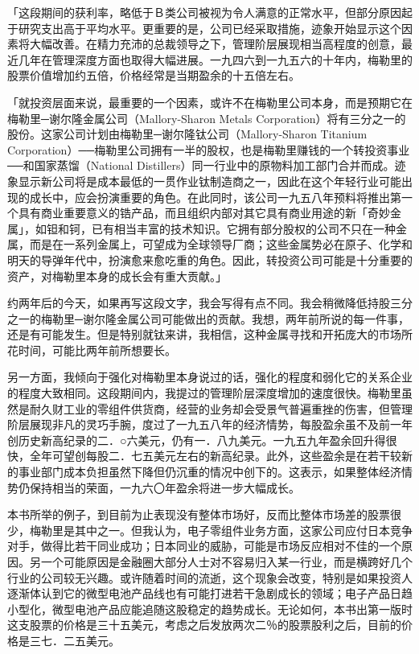 \documentclass[UTF8,a4paper,zihao=-4,fontset = windows]{ctexart} %
\begin{document}
「这段期间的获利率，略低于Ｂ类公司被视为令人满意的正常水平，但部分原因起于研究支出高于平均水平。更重要的是，公司已经采取措施，迹象开始显示这个因素将大幅改善。在精力充沛的总裁领导之下，管理阶层展现相当高程度的创意，最近几年在管理深度方面也取得大幅进展。一九四六到一九五六的十年内，梅勒里的股票价值增加约五倍，价格经常是当期盈余的十五倍左右。

「就投资层面来说，最重要的一个因素，或许不在梅勒里公司本身，而是预期它在梅勒里─谢尔隆金属公司（Mallory-Sharon Metals Corporation）将有三分之一的股份。这家公司计划由梅勒里─谢尔隆钛公司（Mallory-Sharon Titanium Corporation）──梅勒里公司拥有一半的股权，也是梅勒里赚钱的一个转投资事业──和国家蒸馏（National Distillers）同一行业中的原物料加工部门合并而成。迹象显示新公司将是成本最低的一贯作业钛制造商之一，因此在这个年轻行业可能出现的成长中，应会扮演重要的角色。在此同时，该公司一九五八年预料将推出第一个具有商业重要意义的锆产品，而且组织内部对其它具有商业用途的新「奇妙金属」，如钽和钶，已有相当丰富的技术知识。它拥有部分股权的公司不只在一种金属，而是在一系列金属上，可望成为全球领导厂商；这些金属势必在原子、化学和明天的导弹年代中，扮演愈来愈吃重的角色。因此，转投资公司可能是十分重要的资产，对梅勒里本身的成长会有重大贡献。」

约两年后的今天，如果再写这段文字，我会写得有点不同。我会稍微降低持股三分之一的梅勒里─谢尔隆金属公司可能做出的贡献。我想，两年前所说的每一件事，还是有可能发生。但是特别就钛来讲，我相信，这种金属寻找和开拓庞大的市场所花时间，可能比两年前所想要长。

另一方面，我倾向于强化对梅勒里本身说过的话，强化的程度和弱化它的关系企业的程度大致相同。这段期间内，我提过的管理阶层深度增加的速度很快。梅勒里虽然是耐久财工业的零组件供货商，经营的业务却会受景气普遍重挫的伤害，但管理阶层展现非凡的灵巧手腕，度过了一九五八年的经济情势，每股盈余虽不及前一年创历史新高纪录的二．○六美元，仍有一．八九美元。一九五九年盈余回升得很快，全年可望创每股二．七五美元左右的新高纪录。此外，这些盈余是在若干较新的事业部门成本负担虽然下降但仍沉重的情况中创下的。这表示，如果整体经济情势仍保持相当的荣面，一九六〇年盈余将进一步大幅成长。

本书所举的例子，到目前为止表现没有整体市场好，反而比整体市场差的股票很少，梅勒里是其中之一。但我认为，电子零组件业务方面，这家公司应付日本竞争对手，做得比若干同业成功；日本同业的威胁，可能是市场反应相对不佳的一个原因。另一个可能原因是金融圈大部分人士对不容易归入某一行业，而是横跨好几个行业的公司较无兴趣。或许随着时间的流逝，这个现象会改变，特别是如果投资人逐渐体认到它的微型电池产品线也有可能打进若干急剧成长的领域；电子产品日趋小型化，微型电池产品应能追随这股稳定的趋势成长。无论如何，本书出第一版时这支股票的价格是三十五美元，考虑之后发放两次二％的股票股利之后，目前的价格是三七．二五美元。
\end{document}
